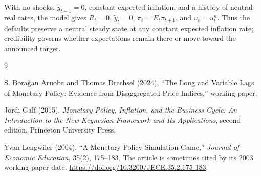 \documentclass[11pt]{article}
\newcommand{\gap}{\widetilde y}
\begin{document}
With no shocks, $\gap_{t-1}=0$, constant expected inflation, and a history of
neutral real rates, the model gives $R_t=0$, $\gap_t=0$, $\pi_t=E_t\pi_{t+1}$,
and $u_t=u_t^n$.  Thus the defaults preserve a neutral steady state at any
constant expected inflation rate; credibility governs whether expectations
remain there or move toward the announced target.

\begin{thebibliography}{9}

S. Bora\u{g}an Aruoba and Thomas Drechsel (2024),
``The Long and Variable Lags of Monetary Policy: Evidence from Disaggregated
Price Indices,'' working paper.

Jordi Gal\'i (2015),
\emph{Monetary Policy, Inflation, and the Business Cycle: An Introduction to
the New Keynesian Framework and Its Applications}, second edition,
Princeton University Press.

Yvan Lengwiler (2004),
``A Monetary Policy Simulation Game,''
\emph{Journal of Economic Education}, 35(2), 175--183.
The article is sometimes cited by its 2003 working-paper date.
\url{https://doi.org/10.3200/JECE.35.2.175-183}.

\end{thebibliography}
\end{document}
